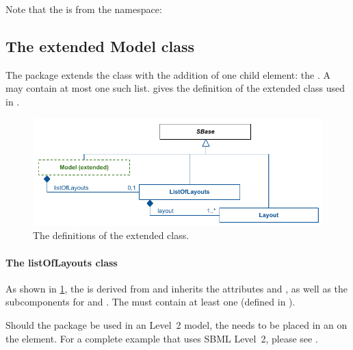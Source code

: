 \begin{center}
\end{center}

Note that the  is from the  namespace: 

\begin{center}
\end{center}

\subsection{The extended Model class}
\label{model-class}

The \Layout package extends the \SBML \Model class with the addition of one
child element: the . A \Model may contain at most one
such list.   gives the definition of the extended
\Model class used in \Layout.

\begin{figure}[!ht]
\includegraphics{uml/layout-extended-model-uml}
\caption{The definitions of the extended \Model class.}
\label{figure:extendedmodel}
\end{figure}

\paragraph{The listOfLayouts class}
\label{listoflayouts-class}
As shown in \ref{figure:extendedmodel}, the \ListOfLayouts is derived from 
\SBase and inherits the attributes  and , 
as well as the subcomponents for \Annotation and \Notes. The 
\ListOfLayouts must contain at least one \Layout (defined in 
). 

Should the \Layout package be used in an \SBML Level~2 model, the 
\ListOfLayouts needs to be placed in an \Annotation on the \Model element. 
For a complete example that uses SBML Level~2, please see .

